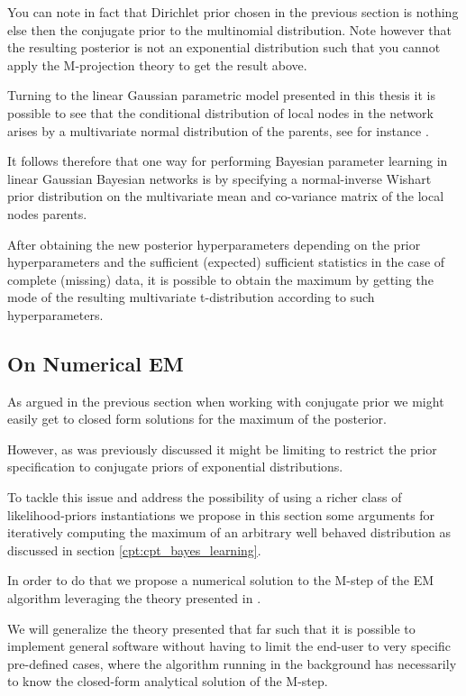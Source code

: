 \documentclass[11pt]{article}
\begin{document}
\begin{article}
You can note in fact that Dirichlet prior chosen in the previous
section is nothing else then the conjugate prior to the
multinomial distribution. Note however that the resulting
posterior is not an exponential distribution such that you cannot
apply the M-projection theory to get the result above.

Turning to the linear Gaussian parametric model presented in this
thesis it is possible to see that the conditional distribution of
local nodes in the network arises by a multivariate normal
distribution of the parents, see for instance
\cite{koller2009probabilistic}.

It follows therefore that one way for performing Bayesian
parameter learning in linear Gaussian Bayesian networks is by
specifying a normal-inverse Wishart prior distribution on the
multivariate mean and co-variance matrix of the local nodes
parents.

After obtaining the new posterior hyperparameters depending on the
prior hyperparameters and the sufficient (expected) sufficient
statistics in the case of complete (missing) data, it is possible
to obtain the maximum by getting the mode of the resulting
multivariate t-distribution according to such hyperparameters.

\subsection{On Numerical EM}
\label{sec:org26a9207}

As argued in the previous section when working with conjugate prior
we might easily get to closed form solutions for the maximum of the
posterior.

However, as was previously discussed it might be limiting to
restrict the prior specification to conjugate priors of exponential
distributions.

To tackle this issue and address the possibility of using a richer
class of likelihood-priors instantiations we propose in this
section some arguments for iteratively computing the maximum of an
arbitrary well behaved distribution as discussed in section \ref{cpt:cpt_bayes_learning}.

In order to do that we propose a numerical solution to the M-step
of the EM algorithm leveraging the theory presented in
\cite{ruud1989comparison}.

We will generalize the theory presented that far such that it is
possible to implement general software without having to limit the
end-user to very specific pre-defined cases, where the algorithm
running in the background has necessarily to know the closed-form
analytical solution of the M-step.


\end{article}
\end{document}
